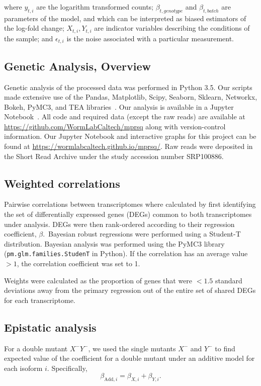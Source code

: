 \documentclass[10pt, onecolumn]{article}
\begin{document}
where $y_{t, i}$ are the logarithm transformed counts; $\beta_{t, genotype}$ and
$\beta_{t, batch}$ are parameters of the model, and which can be interpreted as
biased estimators of the log-fold change; $X_{t, i}, Y_{t, i}$ are indicator
variables describing the conditions of the sample; and $\epsilon_{t, i}$ is the
noise associated with a particular measurement.

\subsection*{Genetic Analysis, Overview}
Genetic analysis of the processed data was performed in Python 3.5. Our scripts
made extensive use of the Pandas, Matplotlib, Scipy, Seaborn, Sklearn, Networkx,
Bokeh, PyMC3, and TEA libraries~\cite{Team2014,McKinney2011,Oliphant2007,
Pedregosa2012,Salvatier2015,VanDerWalt2011,Hunter2007,Angeles-Albores2016,Waskom}.
Our analysis is available in a Jupyter Notebook~\cite{Perez2007}. All code and
required data (except the raw reads) are available at
\url{https://github.com/WormLabCaltech/mprsq} along with version-control
information. Our Jupyter Notebook and interactive graphs for this project can be
found at \url{https://wormlabcaltech.github.io/mprsq/}. Raw reads were deposited
in the Short Read Archive under the study accession number SRP100886.


\subsection*{Weighted correlations}
Pairwise correlations between transcriptomes where calculated by first identifying
the set of differentially expressed genes (DEGs) common to both transcriptomes under
analysis. DEGs were then rank-ordered according to their regression coefficient,
$\beta$.\ Bayesian robust regressions were performed using a Student-T distribution.
Bayesian analysis was performed using the PyMC3 library~\cite{Salvatier2015}
(\texttt{pm.glm.families.StudenT} in Python). If the correlation has an average
value $>1$, the correlation coefficient was set to 1.

Weights were calculated as the proportion of genes that were $<1.5$ standard
deviations away from the primary regression out of the entire set of shared DEGs
for each transcriptome.

\subsection*{Epistatic analysis}
For a double mutant $X^-Y^-$, we used the single mutants $X^-$ and $Y^-$ to
find expected value of the coefficient for a double mutant under an additive model
for each isoform $i$.
Specifically,
\begin{equation}
  \beta_{\mathrm{Add},i} = \beta_{X,i} + \beta_{Y,i}.
\end{equation}
\end{document}
